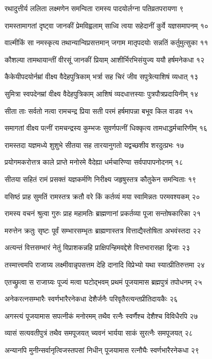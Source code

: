 रथादुत्तीर्य ललिता लक्ष्मणेन समन्विता
रामस्य पादयोर्लग्ना पतिव्रतपरायणा ९

रामस्तामागतां दृष्ट्वा जानकीं प्रेमविह्वलाम्
साध्वि त्वया सहेदानीं कुर्वे यज्ञसमापनम् १०

वाल्मीकिं सा नमस्कृत्य तथान्यान्विप्रसत्तमान्
जगाम मातृपदयोः सन्नतिं कर्तुमुत्सुका ११

कौशल्या तामथायान्तीं वीरसूं जानकीं प्रियाम्
आशीर्भिरभिसंयुज्य ययौ हर्षमनेकधा १२

कैकेयीपदयोर्नम्रां वीक्ष्य वैदेहपुत्रिकाम्
भर्त्रा सह चिरं जीव सपुत्रेत्याशिषं व्यधात् १३

सुमित्रा स्वपदेनम्रां वीक्ष्य वैदेहपुत्रिकाम्
आशिषं व्यदधात्तस्याः पुत्रपौत्रप्रदायिनीम् १४

सीता ताः सर्वतो नत्वा रामचन्द्र प्रिया सती
परमं हर्षमापन्ना बभूव किल वाडव १५

समागतां वीक्ष्य पत्नीं रामचन्द्रस्य कुम्भजः
सुवर्णपत्नीं धिक्कृत्य तामधाद्धर्मचारिणीम् १६

रामस्तदा यज्ञमध्ये शुशुभे सीतया सह
तारयानुगतो यद्वच्छशीव शरदुत्प्रभः १७

प्रयोगमकरोत्तत्र काले प्राप्ते मनोरमे
वैदेह्या धर्मचारिण्या सर्वपापापनोदनम् १८

सीतया सहितं रामं प्रसक्तं यज्ञकर्मणि
निरीक्ष्य जहृषुस्तत्र कौतुकेन समन्विताः १९

वसिष्ठं प्राह सुमतिं रामस्तत्र क्रतौ वरे
किं कर्तव्यं मया स्वामिन्नतः परमवश्यकम् २०

रामस्य वचनं श्रुत्वा गुरुः प्राह महामतिः
ब्राह्मणानां प्रकर्तव्या पूजा सन्तोषकारिका २१

मरुत्तेन क्रतुः सृष्टः पूर्वं सम्भारसम्भृतः
ब्राह्मणास्तत्र वित्ताद्यैस्तोषिता अभवंस्तदा २२

अत्यन्तं वित्तसम्भारं नेतुं विप्राशकन्नहि
प्राक्षिपन्हिमवद्देशे वित्तभारासहा द्विजाः २३

तस्मात्त्वमपि राजाग्र्य लक्ष्मीवान्नृपसत्तम
देहि दानादि विप्रेभ्यो यथा स्यात्प्रीतिरुत्तमा २४

एतच्छ्रुत्वा स राजाग्र्यः पूज्यं मत्वा घटोद्भवम्
प्रथमं पूजयामास ब्रह्मपुत्रं तपोधनम् २५

अनेकरत्नसम्भारैः स्वर्णभारैरनेकधा
देशैर्जनैः परिवृतैरत्यन्तप्रीतिदायकैः २६

अगस्त्यं पूजयामास सपत्नीकं मनोरमम्
तथैव रत्नैः स्वर्णैश्च देशैश्च विविधैरपि २७

व्यासं सत्यवतीपुत्रं तथैव समपूजयत्
च्यवनं भार्यया साकं सुरत्नैः समपूजयत् २८

अन्यानपि मुनीन्सर्वानृत्विजस्तपसां निधीन्
पूजयामास रत्नौघैः स्वर्णभारैरनेकधा २९

